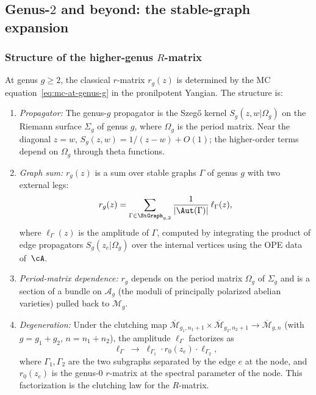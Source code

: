 \subsection{Genus-$2$ and beyond: the stable-graph expansion}

\subsubsection{Structure of the higher-genus $R$-matrix}

\begin{proposition}
At genus $g \ge 2$, the classical $r$-matrix $r_g(z)$ is
determined by the MC equation~\eqref{eq:mc-at-genus-g} in the
pronilpotent Yangian. The structure is:
\begin{enumerate}[label=\textup{(\roman*)}]
\item \emph{Propagator:} The genus-$g$ propagator is the
Szeg\H{o} kernel $S_g(z, w|\Omega_g)$ on the Riemann surface
$\Sigma_g$ of genus $g$, where $\Omega_g$ is the period matrix.
Near the diagonal $z = w$, $S_g(z,w) = 1/(z-w) + O(1)$; the
higher-order terms depend on $\Omega_g$ through theta functions.

\item \emph{Graph sum:} $r_g(z)$ is a sum over stable graphs
$\Gamma$ of genus $g$ with two external legs:
\begin{equation}
r_g(z)
= \sum_{\Gamma \in \StGraph_{g,2}}
\frac{1}{|\Aut(\Gamma)|}\,
\ell_\Gamma(z),
\end{equation}
where $\ell_\Gamma(z)$ is the amplitude of $\Gamma$, computed
by integrating the product of edge propagators $S_g(z_e|\Omega_g)$
over the internal vertices using the OPE data of~$\cA$.

\item \emph{Period-matrix dependence:} $r_g$ depends on the
period matrix $\Omega_g$ of $\Sigma_g$ and is a section of
a bundle on $\mathcal{A}_g$ (the moduli of principally polarized
abelian varieties) pulled back to $\mathcal{M}_g$.

\item \emph{Degeneration:} Under the clutching map
$\overline{\mathcal{M}}_{g_1, n_1+1} \times
\overline{\mathcal{M}}_{g_2, n_2+1} \to
\overline{\mathcal{M}}_{g, n}$ (with $g = g_1 + g_2$,
$n = n_1 + n_2$), the amplitude $\ell_\Gamma$ factorizes as
\[
\ell_\Gamma \;\to\;
\ell_{\Gamma_1} \cdot r_0(z_e) \cdot \ell_{\Gamma_2},
\]
where $\Gamma_1, \Gamma_2$ are the two subgraphs separated
by the edge $e$ at the node, and $r_0(z_e)$ is the genus-$0$
$r$-matrix at the spectral parameter of the node. This
factorization is the clutching law for the $R$-matrix.
\end{enumerate}
\end{proposition}

